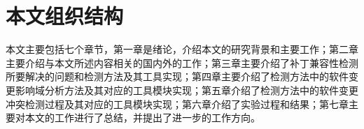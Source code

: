 %
%
%
%
%


\section{本文组织结构}

本文主要包括七个章节，第一章是绪论，介绍本文的研究背景和主要工作；第二章主要介绍与本文所述内容相关的国内外的工作；第三章主要介绍了补丁兼容性检测所要解决的问题和检测方法及其工具实现；第四章主要介绍了检测方法中的软件变更影响域分析方法及其对应的工具模块实现；第五章介绍了检测方法中的软件变更冲突检测过程及其对应的工具模块实现；第六章介绍了实验过程和结果；第七章主要对本文的工作进行了总结，并提出了进一步的工作方向。


